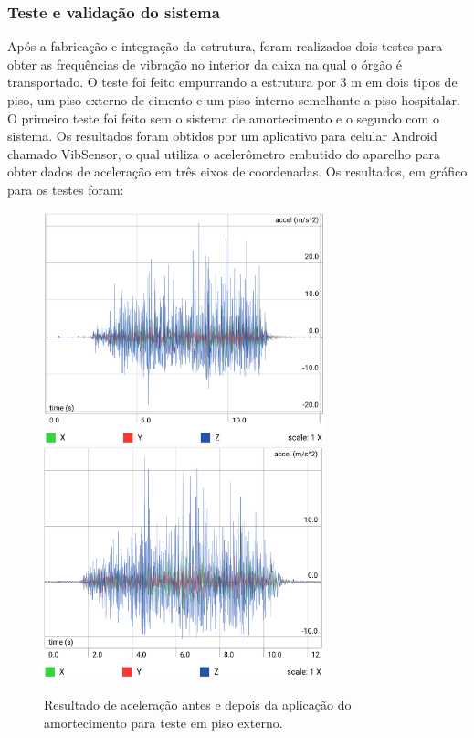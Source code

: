 \subsubsection{Teste e validação do sistema}

Após a fabricação e integração da estrutura, foram realizados dois testes para obter as frequências de vibração no interior da caixa na qual o órgão é transportado. O teste foi feito empurrando a estrutura por 3 m em dois tipos de piso, um piso externo de cimento e um piso interno semelhante a piso hospitalar. O primeiro teste foi feito sem o sistema de amortecimento e o segundo com o sistema. Os resultados foram obtidos por um aplicativo para celular Android chamado VibSensor, o qual utiliza o acelerômetro embutido do aparelho para obter dados de aceleração em três eixos de coordenadas. Os resultados, em gráfico para os testes foram:


\begin{figure}[H]
	\centering
	\includegraphics[height=190pt]{figuras/piso_ext_sem_amortecimento.png}
	\includegraphics[height=190pt]{figuras/piso_ext_com_amortecimento.png}
	\caption{Resultado de aceleração antes e depois da aplicação do amortecimento para teste em piso externo.}
\end{figure}

